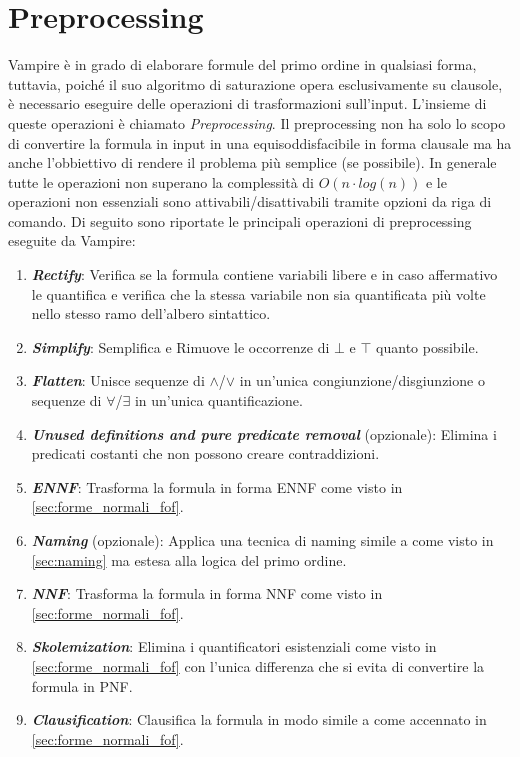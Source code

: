\documentclass[./main.tex]{subfiles}
\begin{document}
\section{Preprocessing} \label{sec:vampire_preprocessing}
Vampire è in grado di elaborare formule del primo ordine in qualsiasi forma, 
tuttavia, poiché il suo algoritmo di saturazione opera esclusivamente su clausole,
è necessario eseguire delle operazioni di trasformazioni sull'input.
L'insieme di queste operazioni è chiamato \textit{Preprocessing}.
Il preprocessing non ha solo lo scopo di convertire la formula in input in una 
equisoddisfacibile in forma clausale ma ha anche l'obbiettivo di rendere il problema più
semplice (se possibile).
In generale tutte le operazioni non superano la complessità di $O(n \cdot log(n))$ 
e le operazioni non essenziali sono attivabili/disattivabili tramite opzioni da riga di comando.
Di seguito sono riportate le principali operazioni di preprocessing eseguite da Vampire:

\begin{enumerate}
    \item \textbf{\textit{Rectify}}:
    Verifica se la formula contiene variabili libere e in caso affermativo le quantifica
    e verifica che la stessa variabile non sia quantificata più volte nello stesso ramo dell'albero sintattico.
    \item \textbf{\textit{Simplify}}:
    Semplifica e Rimuove le occorrenze di $\bot$ e $\top$ quanto possibile.
    \item \textbf{\textit{Flatten}}:
    Unisce sequenze di $\land$/$\lor$ in un'unica congiunzione/disgiunzione o 
    sequenze di $\forall$/$\exists$ in un'unica quantificazione.
    \item \textbf{\textit{Unused definitions and pure predicate removal}} (opzionale): 
    Elimina i predicati costanti che non possono creare contraddizioni.
    \item \textbf{\textit{ENNF}}:
    Trasforma la formula in forma ENNF come visto in \ref{sec:forme_normali_fof}.
    \item \textbf{\textit{Naming}} (opzionale):
    Applica una tecnica di naming simile a come visto in \ref{sec:naming} ma estesa alla logica del primo ordine.
    \item \textbf{\textit{NNF}}:
    Trasforma la formula in forma NNF come visto in \ref{sec:forme_normali_fof}.
    \item \textbf{\textit{Skolemization}}:
    Elimina i quantificatori esistenziali come visto in \ref{sec:forme_normali_fof} con l'unica 
    differenza che si evita di convertire la formula in PNF.
    \item \textbf{\textit{Clausification}}:
    Clausifica la formula in modo simile a come accennato in \ref{sec:forme_normali_fof}.
\end{enumerate}
\end{document}
